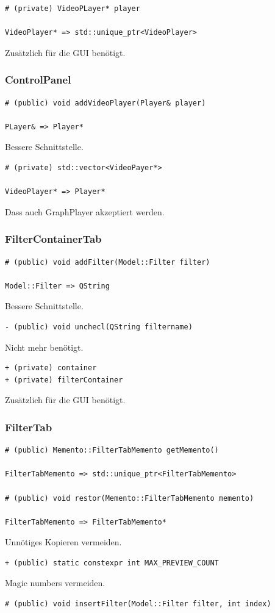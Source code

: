 \documentclass{scrartcl}
\begin{document}
{\begin{verbatim}
# (private) VideoPLayer* player

VideoPlayer* => std::unique_ptr<VideoPlayer>
\end{verbatim}
Zusätzlich für die GUI benötigt.
\newpage
\subsubsection{ControlPanel}
\begin{verbatim}
# (public) void addVideoPlayer(Player& player)

PLayer& => Player*
\end{verbatim}
Bessere Schnittstelle.
\bigskip
\begin{verbatim}
# (private) std::vector<VideoPayer*>

VideoPlayer* => Player*
\end{verbatim}
Dass auch GraphPlayer akzeptiert werden.
\bigskip
\subsubsection{FilterContainerTab}
\begin{verbatim}
# (public) void addFilter(Model::Filter filter)

Model::Filter => QString
\end{verbatim}
Bessere Schnittstelle.
\bigskip
\begin{verbatim}
- (public) void unchecl(QString filtername)
\end{verbatim}
Nicht mehr benötigt.
\bigskip
\begin{verbatim}
+ (private) container
+ (private) filterContainer
\end{verbatim}
Zusätzlich für die GUI benötigt.
\newpage
\subsubsection{FilterTab}
\bigskip
\begin{verbatim}
# (public) Memento::FilterTabMemento getMemento()

FilterTabMemento => std::unique_ptr<FilterTabMemento>

# (public) void restor(Memento::FilterTabMemento memento)

FilterTabMemento => FilterTabMemento*
\end{verbatim}
Unnötiges Kopieren vermeiden.
\bigskip
\begin{verbatim}
+ (public) static constexpr int MAX_PREVIEW_COUNT
\end{verbatim}
Magic numbers vermeiden.
\bigskip
\begin{verbatim}
# (public) void insertFilter(Model::Filter filter, int index)


\end{verbatim}}
\end{document}

